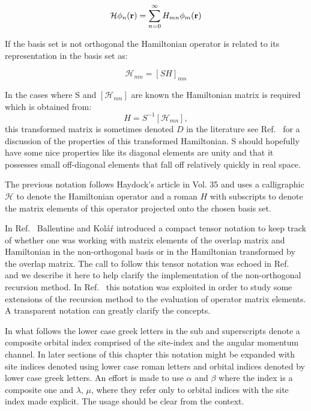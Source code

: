 \begin{equation}
\mathcal{H}\phi_{n}(\mathbf{r}) = \sum_{n=0}^{\infty} H_{mn}\phi_{m}({\bf r})
\end{equation}

If the basis set is not orthogonal the Hamiltonian operator
is related to its representation in the basis set as:

\begin{equation}
\mathcal{H}_{mn} = [SH]_{mn}
\end{equation}

In the cases where S and $[\mathcal{H}_{mn}]$ are known the Hamiltonian
matrix is required which is obtained from:
%
\begin{equation}
H = S^{-1}[\mathcal{H}_{mn}],
\end{equation}
%
this transformed matrix is sometimes denoted $D$ in the literature
see Ref.~\cite{weeks73} for a discussion of the properties of
this transformed Hamiltonian. S should hopefully have some 
nice properties like its diagonal elements are unity and that it 
possesses small off-diagonal elements that fall off relatively 
quickly in real space.

The previous notation follows Haydock's article in Vol. 35 and uses 
a calligraphic $\mathcal{H}$ to denote the Hamiltonian operator and 
a roman $H$ with subscripts to denote the matrix elements of this operator 
projected onto the chosen basis set. 

In Ref.~\cite{ballentine86} Ballentine and Kol\'a\'r introduced 
a compact tensor notation to keep track of whether one was working 
with matrix elements of the overlap matrix and Hamiltonian 
in the non-orthogonal basis or in the Hamiltonian transformed by
the overlap matrix. The call to follow this tensor notation 
was echoed in Ref.~\cite{sutton88} and we describe it here to help
clarify the implementation of the non-orthogonal recursion method.
In Ref.~\cite{foulkes86} this notation was exploited in order to 
study some extensions of the recursion method to the evaluation of 
operator matrix elements. A transparent notation can greatly clarify
the concepts.

In what follows the lower case greek letters in the sub and superscripts
denote a composite orbital index comprised of the site-index and the 
angular momentum channel. In later sections of this chapter this notation
might be expanded with site indices denoted using lower case
roman letters and orbital indices denoted by lower case greek letters.
An effort is made to use $\alpha$ and $\beta$ where the index is a composite
one and $\lambda$, $\mu$, where they refer only to orbital indices with the 
site index made explicit. The usage should be clear from the context.

